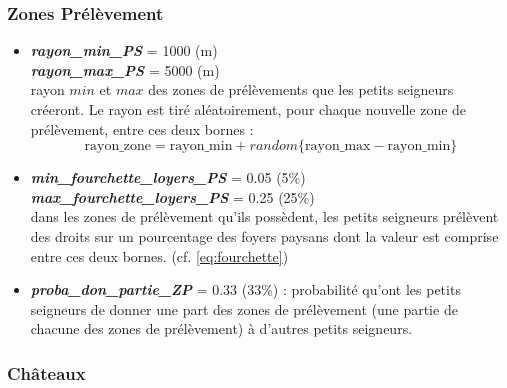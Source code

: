 \documentclass[a4paper,11pt]{article}
\begin{document}
{\subsubsection{Zones Prélèvement}
\begin{itemize}
	\item \textbf{\textit{rayon\_min\_PS}} = 1000 (m)\\
	\textbf{\textit{rayon\_max\_PS}}  = 5000 (m)\\
	rayon $min$ et $max$ des zones de prélèvements que les petits seigneurs créeront. Le rayon est tiré aléatoirement, pour chaque nouvelle zone de prélèvement, entre ces deux bornes :
	\begin{equation}\label{eq:fourchette}
	\text{rayon\_zone} = \text{rayon\_min} +
	random\{\text{rayon\_max} - \text{rayon\_min}\}
	\end{equation}

	\item \textbf{\textit{min\_fourchette\_loyers\_PS}} = 0.05 (5\%) \\
	\textbf{\textit{max\_fourchette\_loyers\_PS}} = 0.25 (25\%)\\
	dans les zones de prélèvement qu'ils possèdent, les petits seigneurs prélèvent des droits sur un pourcentage des foyers paysans dont la valeur est comprise entre ces deux bornes. (cf. \autoref{eq:fourchette})
	

	\item \textbf{\textit{proba\_don\_partie\_ZP}} = 0.33 (33\%) : probabilité qu'ont les petits seigneurs de donner une part des zones de prélèvement (une partie de chacune des zones de prélèvement) à d'autres petits seigneurs.
\end{itemize}

\subsubsection{Châteaux}
\begin{itemize}
	

\end{itemize}}
\end{document}
